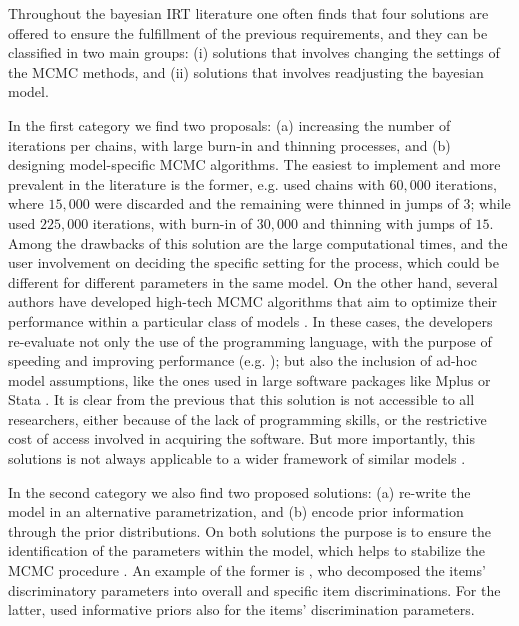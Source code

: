 Throughout the bayesian IRT literature one often finds that four solutions are offered to ensure the fulfillment of the previous requirements, and they can be classified in two main groups: (i) solutions that involves changing the settings of the MCMC methods, and (ii) solutions that involves readjusting the bayesian model. 

In the first category we find two proposals: (a) increasing the number of iterations per chains, with large burn-in and thinning processes, and (b) designing model-specific MCMC algorithms. The easiest to implement and more prevalent in the literature is the former, e.g. \citet{Fujimoto_2018a} used chains with $60,000$ iterations, where $15,000$ were discarded and the remaining were thinned in jumps of $3$; while \citet{Fujimoto_2018b} used $225,000$ iterations, with burn-in of $30,000$ and thinning with jumps of $15$. Among the drawbacks of this solution are the large computational times, and the user involvement on deciding the specific setting for the process, which could be different for different parameters in the same model. On the other hand, several authors have developed high-tech MCMC algorithms that aim to optimize their performance within a particular class of models \cite{Papaspiliopoulos_et_al_2007}. In these cases, the developers re-evaluate not only the use of the programming language, with the purpose of speeding and improving performance (e.g. \citet{Fujimoto_2018a}); but also the inclusion of ad-hoc model assumptions, like the ones used in large software packages like Mplus \cite{Muthen_et_al_2011} or Stata \cite{Rabe_et_al_2004c}. It is clear from the previous that this solution is not accessible to all researchers, either because of the lack of programming skills, or the restrictive cost of access involved in acquiring the software. But more importantly, this solutions is not always applicable to a wider framework of similar models \cite{Papaspiliopoulos_et_al_2007}.

In the second category we also find two proposed solutions: (a) re-write the model in an alternative parametrization, and (b) encode prior information through the prior distributions. On both solutions the purpose is to ensure the identification of the parameters within the model, which helps to stabilize the MCMC procedure \cite{Gelman_et_al_2014}. An example of the former is \citet{Fujimoto_2018a}, who decomposed the items' discriminatory parameters into overall and specific item discriminations. For the latter, \citet{Fujimoto_2020} used informative priors also for the items' discrimination parameters.

